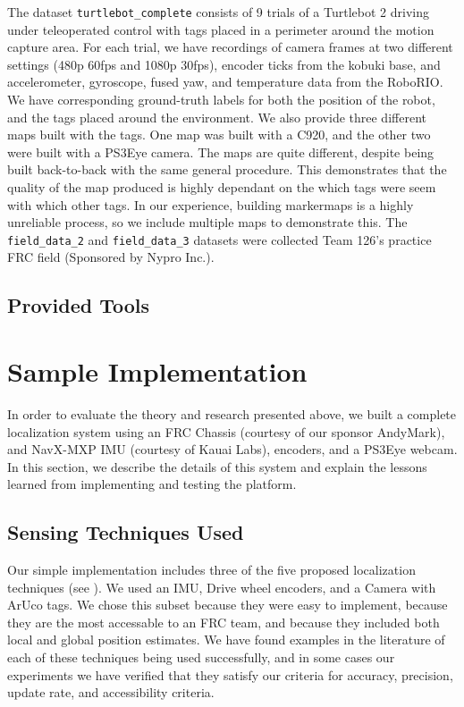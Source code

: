 \documentclass{article}
\newcommand{\Newnameref}[1]{\textit{\nameref{#1}}}
\begin{document}
  The dataset \texttt{turtlebot\_complete} consists of 9 trials of a Turtlebot 2 driving under teleoperated control with tags placed in a perimeter around the motion capture area. For each trial, we have recordings of camera frames at two different settings (480p 60fps and 1080p 30fps), encoder ticks from the kobuki base, and accelerometer, gyroscope, fused yaw, and temperature data from the RoboRIO. We have corresponding ground-truth labels for both the position of the robot, and the tags placed around the environment. We also provide three different maps built with the tags. One map was built with a C920, and the other two were built with a PS3Eye camera. The maps are quite different, despite being built back-to-back with the same general procedure. This demonstrates that the quality of the map produced is highly dependant on the which tags were seem with which other tags. In our experience, building markermaps is a highly unreliable process, so we include multiple maps to demonstrate this.
  The \texttt{field\_data\_2} and \texttt{field\_data\_3} datasets were collected Team 126's practice FRC field (Sponsored by Nypro Inc.).

  \subsection{Provided Tools} \label{section:tools}




\section{Sample Implementation} \label{section:specs}

  In order to evaluate the theory and research presented above, we built a complete localization system using an FRC Chassis (courtesy of our sponsor AndyMark), and NavX-MXP IMU (courtesy of Kauai Labs), encoders, and a PS3Eye webcam. In this section, we describe the details of this system and explain the lessons learned from implementing and testing the platform.

  \subsection{Sensing Techniques Used}\label{section:techniques_used}

    Our simple implementation includes three of the five proposed localization techniques (see \Newnameref{section:proposed_techniques}). We used an IMU, Drive wheel encoders, and a Camera with ArUco tags. We chose this subset because they were easy to implement, because they are the most accessable to an FRC team, and because they included both local and global position estimates. We have found examples in the literature of each of these techniques being used successfully, and in some cases our experiments we have verified that they satisfy our criteria for accuracy, precision, update rate, and accessibility criteria.
\end{document}
